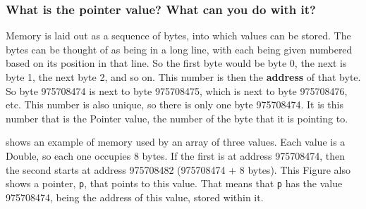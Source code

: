 

\clearpage
\subsubsection{What is the pointer value? What can you do with it?} %
\label{ssub:what_is_the_pointer_value_what_can_you_do_with_it_}

Memory is laid out as a sequence of bytes, into which values can be stored. The bytes can be thought of as being in a long line, with each being given numbered based on its position in that line. So the first byte would be byte 0, the next is byte 1, the next byte 2, and so on. This number is then the \textbf{address} of that byte. So byte 975708474 is next to byte 975708475, which is next to byte 975708476, etc. This number is also unique, so there is only one byte 975708474. It is this number that is the Pointer value, the number of the byte that it is pointing to.

 shows an example of memory used by an array of three values. Each value is a Double, so each one occupies 8 bytes. If the first is at address 975708474, then the second starts at address 975708482 (975708474 + 8 bytes). This Figure also shows a pointer, \texttt{p}, that points to this value. That means that \texttt{p} has the value 975708474, being the address of this value, stored within it.

